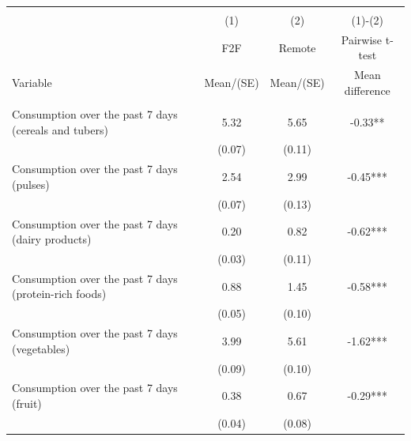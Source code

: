 
\begin{tabular}{@{\extracolsep{5pt}}lccc}
\\[-1.8ex]\hline \hline \\[-1.8ex]
 & \multicolumn{1}{c}{(1)}  & \multicolumn{1}{c}{(2)}  & \multicolumn{1}{c}{(1)-(2)} \\
 & \multicolumn{1}{c}{F2F}  & \multicolumn{1}{c}{Remote}  & \multicolumn{1}{c}{Pairwise t-test}  \\
Variable & Mean/(SE) & Mean/(SE) & Mean difference \\ \hline \\[-1.8ex] 
Consumption over the past 7 days (cereals and tubers)   & 5.32    & 5.65    & -0.33**   \\
 & (0.07)  & (0.11)  &  \\ [1ex]
Consumption over the past 7 days (pulses)   & 2.54    & 2.99    & -0.45***   \\
 & (0.07)  & (0.13)  &  \\ [1ex]
Consumption over the past 7 days (dairy products)   & 0.20    & 0.82    & -0.62***   \\
 & (0.03)  & (0.11)  &  \\ [1ex]
Consumption over the past 7 days (protein-rich foods)   & 0.88    & 1.45    & -0.58***   \\
 & (0.05)  & (0.10)  &  \\ [1ex]
Consumption over the past 7 days (vegetables)   & 3.99    & 5.61    & -1.62***   \\
 & (0.09)  & (0.10)  &  \\ [1ex]
Consumption over the past 7 days (fruit)   & 0.38    & 0.67    & -0.29***   \\
 & (0.04)  & (0.08)  &  \\ [1ex]

\end{tabular}
